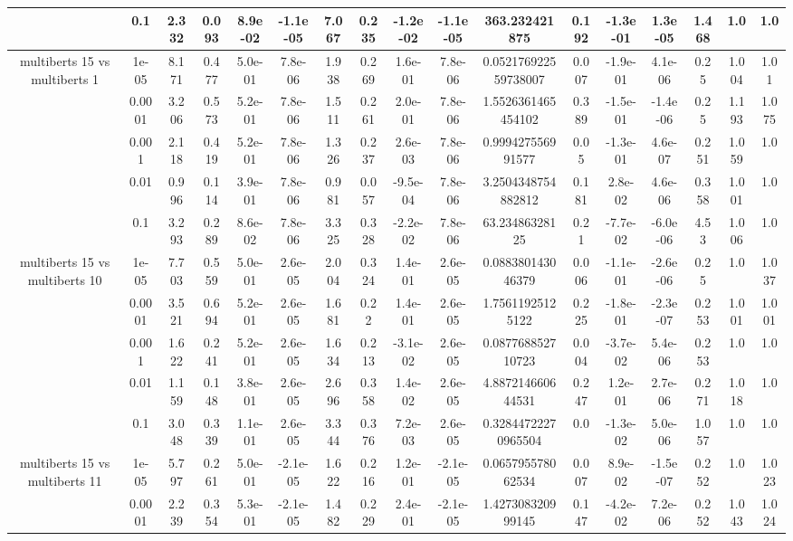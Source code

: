 \begin{tabular}{|c|c|c|c|c|c|c|c|c|c|c|c|c|c|c|c|c|}
 & 0.1 & 2.332 & 0.093 & 8.9e-02 & -1.1e-05 & 7.067 & 0.235 & -1.2e-02 & -1.1e-05 & 363.232421875 & 0.192 & -1.3e-01 & 1.3e-05 & 1.468 & 1.0 & 1.0 \\
\hline
\multirow{5}{*}{multiberts 15 vs multiberts 1} & 1e-05 & 8.171 & 0.477 & 5.0e-01 & 7.8e-06 & 1.938 & 0.269 & 1.6e-01 & 7.8e-06 & 0.052176922559738007 & 0.007 & -1.9e-01 & 4.1e-06 & 0.25 & 1.004 & 1.01 \\
 & 0.0001 & 3.206 & 0.573 & 5.2e-01 & 7.8e-06 & 1.511 & 0.261 & 2.0e-01 & 7.8e-06 & 1.5526361465454102 & 0.389 & -1.5e-01 & -1.4e-06 & 0.25 & 1.193 & 1.075 \\
 & 0.001 & 2.118 & 0.419 & 5.2e-01 & 7.8e-06 & 1.326 & 0.237 & 2.6e-03 & 7.8e-06 & 0.999427556991577 & 0.05 & -1.3e-01 & 4.6e-07 & 0.251 & 1.059 & 1.0 \\
 & 0.01 & 0.996 & 0.114 & 3.9e-01 & 7.8e-06 & 0.981 & 0.057 & -9.5e-04 & 7.8e-06 & 3.2504348754882812 & 0.181 & 2.8e-02 & 4.6e-06 & 0.358 & 1.001 & 1.0 \\
 & 0.1 & 3.293 & 0.289 & 8.6e-02 & 7.8e-06 & 3.325 & 0.328 & -2.2e-02 & 7.8e-06 & 63.23486328125 & 0.21 & -7.7e-02 & -6.0e-06 & 4.53 & 1.006 & 1.0 \\
\hline
\multirow{5}{*}{multiberts 15 vs multiberts 10} & 1e-05 & 7.703 & 0.559 & 5.0e-01 & 2.6e-05 & 2.004 & 0.324 & 1.4e-01 & 2.6e-05 & 0.088380143046379 & 0.006 & -1.1e-01 & -2.6e-06 & 0.25 & 1.0 & 1.037 \\
 & 0.0001 & 3.521 & 0.694 & 5.2e-01 & 2.6e-05 & 1.681 & 0.22 & 1.4e-01 & 2.6e-05 & 1.75611925125122 & 0.225 & -1.8e-01 & -2.3e-07 & 0.253 & 1.001 & 1.001 \\
 & 0.001 & 1.622 & 0.241 & 5.2e-01 & 2.6e-05 & 1.634 & 0.213 & -3.1e-02 & 2.6e-05 & 0.087768852710723 & 0.004 & -3.7e-02 & 5.4e-06 & 0.253 & 1.0 & 1.0 \\
 & 0.01 & 1.159 & 0.148 & 3.8e-01 & 2.6e-05 & 2.696 & 0.358 & 1.4e-02 & 2.6e-05 & 4.887214660644531 & 0.247 & 1.2e-01 & 2.7e-06 & 0.271 & 1.018 & 1.0 \\
 & 0.1 & 3.048 & 0.339 & 1.1e-01 & 2.6e-05 & 3.344 & 0.376 & 7.2e-03 & 2.6e-05 & 0.32844722270965504 & 0.0 & -1.3e-02 & 5.0e-06 & 1.057 & 1.0 & 1.0 \\
\hline
\multirow{5}{*}{multiberts 15 vs multiberts 11} & 1e-05 & 5.797 & 0.261 & 5.0e-01 & -2.1e-05 & 1.622 & 0.216 & 1.2e-01 & -2.1e-05 & 0.065795578062534 & 0.007 & 8.9e-02 & -1.5e-07 & 0.252 & 1.0 & 1.023 \\
 & 0.0001 & 2.239 & 0.354 & 5.3e-01 & -2.1e-05 & 1.482 & 0.229 & 2.4e-01 & -2.1e-05 & 1.427308320999145 & 0.147 & -4.2e-02 & 7.2e-06 & 0.252 & 1.043 & 1.024 \\

\end{tabular}
